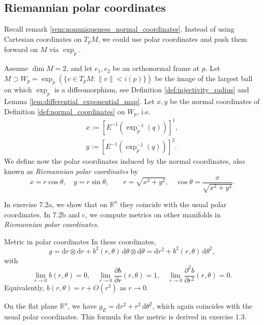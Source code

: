 \subsection{Riemannian polar coordinates}

Recall remark \ref{rem:nonuniqueness_normal_coordinates}. Instead of using Cartesian coordinates on $T_p M$, we could use polar coordinates and push them forward on $M$ via $\exp_p$.

Assume $\dim M = 2$, and let $e_1, e_2$ be an orthonormal frame at $p$. Let $M\supset W_p = \exp_p\left(\{ v \in T_p M : \|v\| < i(p) \}\right)$ be the image of the largest ball on which $\exp_p$ is a diffeomorphism, see Definition \ref{def:injectivity_radius} and Lemma \ref{lem:differential_exponential_map}. Let $x,y$ be the normal coordinates of Definition \ref{def:normal_coordinates} on $W_p$, i.e. 
\begin{align*}
    x:= [E^{-1}(\exp_p^{-1}(q))]^1,\\
    y:= [E^{-1}(\exp_p^{-1}(q))]^2.
\end{align*}
We define now the polar coordinates induced by the normal coordinates, also known as \emph{Riemannian polar coordinates} by
\[
x = r \cos \theta, \quad y = r \sin \theta, \qquad r = \sqrt{x^2 + y^2}, \quad \cos \theta = \frac{x}{\sqrt{x^2 + y^2}}.
\]

In exercise 7.2a, we show that on $\mathbb{R}^n$ they coincide with the usual polar coordinates. In 7.2b and c, we compute metrics on other manifolds in \emph{Riemannian polar coordinates}.



\begin{colorlem}{Metric in polar coordinates}{}
In these coordinates,
\[
g = \mathrm{d} r \otimes \mathrm{d} r + b^2(r, \theta) \, \mathrm{d} \theta \otimes \mathrm{d} \theta = \mathrm{d} r^2 + b^2(r, \theta) \, \mathrm{d} \theta^2,
\]
with
\[
\lim_{r \to 0} b(r, \theta) = 0, \quad \lim_{r \to 0} \frac{\partial b}{\partial r}(r, \theta) = 1, \quad \lim_{r \to 0} \frac{\partial^2 b}{\partial r^2}(r, \theta) = 0.
\]
Equivalently, $b(r, \theta) = r + O(r^3)$ as $r \to 0$.
\end{colorlem}


\begin{colremark}
On the flat plane $\mathbb{R}^n$, we have $g_E = \mathrm{d} r^2 + r^2 \, \mathrm{d} \theta^2$, which again coincides with the usual polar coordinates. This formula for the metric is derived in exercise 1.3.
\end{colremark}

